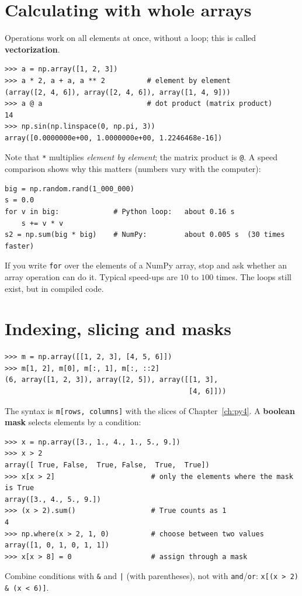 \section*{Calculating with whole arrays}
Operations work on all elements at once, without a loop; this is called \textbf{vectorization}.
\begin{verbatim}
>>> a = np.array([1, 2, 3])
>>> a * 2, a + a, a ** 2          # element by element
(array([2, 4, 6]), array([2, 4, 6]), array([1, 4, 9]))
>>> a @ a                         # dot product (matrix product)
14
>>> np.sin(np.linspace(0, np.pi, 3))
array([0.0000000e+00, 1.0000000e+00, 1.2246468e-16])
\end{verbatim}
Note that \texttt{*} multiplies \emph{element by element}; the matrix product is \texttt{@}. A speed comparison shows why this matters (numbers vary with the computer):
\begin{verbatim}
big = np.random.rand(1_000_000)
s = 0.0
for v in big:             # Python loop:   about 0.16 s
    s += v * v
s2 = np.sum(big * big)    # NumPy:         about 0.005 s  (30 times faster)
\end{verbatim}
\begin{keyidea}
If you write \texttt{for} over the elements of a NumPy array, stop and ask whether an array operation can do it. Typical speed-ups are $10$ to $100$ times. The loops still exist, but in compiled code.
\end{keyidea}

\section*{Indexing, slicing and masks}
\begin{verbatim}
>>> m = np.array([[1, 2, 3], [4, 5, 6]])
>>> m[1, 2], m[0], m[:, 1], m[:, ::2]
(6, array([1, 2, 3]), array([2, 5]), array([[1, 3],
                                            [4, 6]]))
\end{verbatim}
The syntax is \verb!m[rows, columns]! with the slices of Chapter~\ref{ch:py4}. A \textbf{boolean mask} selects elements by a condition:
\begin{verbatim}
>>> x = np.array([3., 1., 4., 1., 5., 9.])
>>> x > 2
array([ True, False,  True, False,  True,  True])
>>> x[x > 2]                       # only the elements where the mask is True
array([3., 4., 5., 9.])
>>> (x > 2).sum()                  # True counts as 1
4
>>> np.where(x > 2, 1, 0)          # choose between two values
array([1, 0, 1, 0, 1, 1])
>>> x[x > 8] = 0                   # assign through a mask
\end{verbatim}
Combine conditions with \verb!&! and \verb!|! (with parentheses), not with \texttt{and}/\texttt{or}: \verb!x[(x > 2) & (x < 6)]!.

